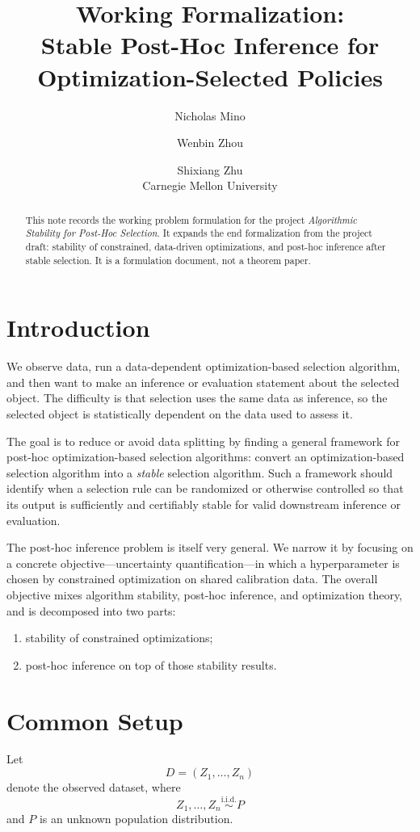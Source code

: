 \documentclass[12pt]{article}
\title{Working Formalization:\\
Stable Post-Hoc Inference for Optimization-Selected Policies}
\author{Nicholas Mino \and Wenbin Zhou \and Shixiang Zhu\\
Carnegie Mellon University}
\date{}
\theoremstyle{plain}
\begin{document}
\maketitle

\begin{abstract}
This note records the working problem formulation for the project
\emph{Algorithmic Stability for Post-Hoc Selection}.
It expands the end formalization from the project draft:
stability of constrained, data-driven optimizations, and post-hoc
inference after stable selection.
It is a formulation document, not a theorem paper.
\end{abstract}

\section{Introduction}
We observe data, run a data-dependent optimization-based selection
algorithm, and then want to make an inference or evaluation statement
about the selected object.
The difficulty is that selection uses the same data as inference, so the
selected object is statistically dependent on the data used to assess it.

The goal is to reduce or avoid data splitting by finding a general
framework for post-hoc optimization-based selection algorithms:
convert an optimization-based selection algorithm into a
\emph{stable} selection algorithm.
Such a framework should identify when a selection rule can be randomized
or otherwise controlled so that its output is sufficiently and
certifiably stable for valid downstream inference or evaluation.

The post-hoc inference problem is itself very general.
We narrow it by focusing on a concrete objective---uncertainty
quantification---in which a hyperparameter is chosen by constrained
optimization on shared calibration data.
The overall objective mixes algorithm stability, post-hoc inference,
and optimization theory, and is decomposed into two parts:
\begin{enumerate}
\item stability of constrained optimizations;
\item post-hoc inference on top of those stability results.
\end{enumerate}

\section{Common Setup}
Let
\[
D=(Z_1,\dots,Z_n)
\]
denote the observed dataset, where
\[
Z_1,\dots,Z_n \overset{\mathrm{i.i.d.}}{\sim} P
\]
and \(P\) is an unknown population distribution.
\end{document}
